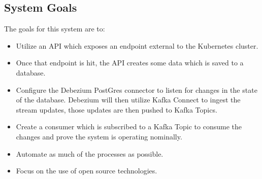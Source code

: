 \begin{flushleft}
	\subsection{System Goals}
	The goals for this system are to:
	\begin{itemize}
		\item Utilize an API which exposes an endpoint external to the Kubernetes cluster.
		\item Once that endpoint is hit, the API creates some data which is saved to a database.
		\item Configure the Debezium PostGres connector to listen for changes in the state of the database. Debezium will then utilize Kafka Connect to ingest the stream updates,
		      those updates are then pushed to Kafka Topics.
		\item Create a consumer which is subscribed to a Kafka Topic to consume the changes and prove the system is operating nominally.
		\item Automate as much of the processes as possible.
		\item Focus on the use of open source technologies.
	\end{itemize}

\end{flushleft}
